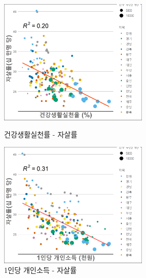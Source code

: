 \documentclass[a4paper, 11pt]{oblivoir}
\begin{document}
    \begin{figure}[!ht]
        \includegraphics[height = 6cm, width = \linewidth]{c15.png}
        \caption{건강생활실천률 - 자살률}
        \label{fig:pic14}
        \endminipage\hfill
        \includegraphics[height = 6cm, width = \linewidth]{c12.png}
        \caption{1인당 개인소득 - 자살률}
        \label{fig:pic15}
        \endminipage\hfill
    \end{figure}
    
\end{document}

